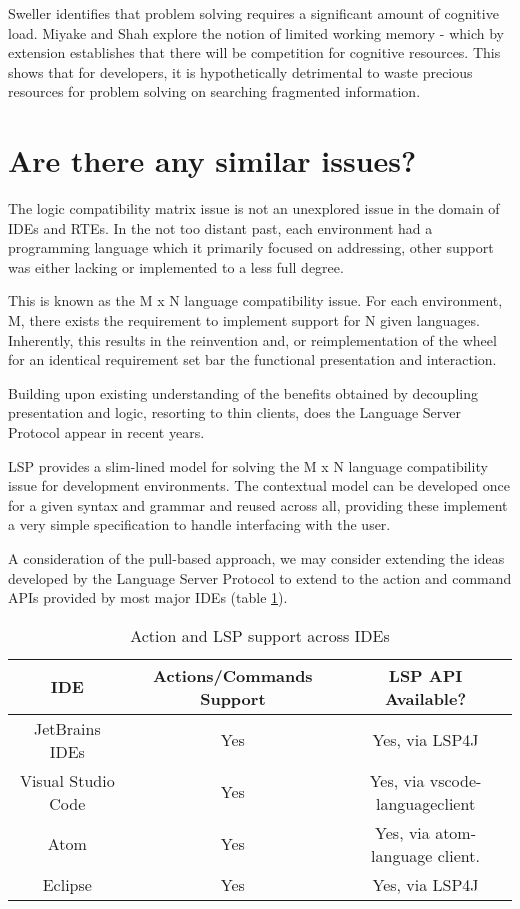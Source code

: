 Sweller \parencite*{sweller1998cognitive} identifies that problem solving requires a significant amount of cognitive load. Miyake and Shah \parencite*{miyake1999models} explore the notion of limited working memory - which by extension establishes that there will be competition for cognitive resources. This shows that for developers, it is hypothetically detrimental to waste precious resources for problem solving on searching fragmented information.


\section{Are there any similar issues?}

The logic compatibility matrix issue is not an unexplored issue in the domain of IDEs and RTEs. In the not too distant past, each environment had a programming language which it primarily focused on addressing, other support was either lacking or implemented to a less full degree. 

This is known as the M x N language compatibility issue. For each environment, M, there exists the requirement to implement support for N given languages. Inherently, this results in the reinvention and, or reimplementation of the wheel for an identical requirement set bar the functional presentation and interaction.

Building upon existing understanding of the benefits obtained by decoupling presentation and logic, resorting to thin clients, does the Language Server Protocol \parencite{lspGitHubSiteMSFT} appear in recent years.

LSP provides a slim-lined model for solving the M x N language compatibility issue for development environments. The contextual model can be developed once for a given syntax and grammar and reused across all, providing these implement a very simple specification to handle interfacing with the user.

A consideration of the pull-based approach, we may consider extending the ideas developed by the Language Server Protocol to extend to the action and command APIs provided by most major IDEs (table \ref{table:1}).

\begin{table}
\centering
\begin{tabular}{ | c | c | c |}
	\hline
		IDE & Actions/Commands Support & LSP API Available?\\
	\hline
	\hline
		JetBrains IDEs & Yes & Yes, via LSP4J\\ 
		Visual Studio Code & Yes & Yes, via vscode-languageclient \\
		Atom & Yes & Yes, via atom-language client.\\
		Eclipse & Yes & Yes, via LSP4J\\
	\hline
\end{tabular}
\caption{Action and LSP support across IDEs}
\label{table:1}
\end{table}